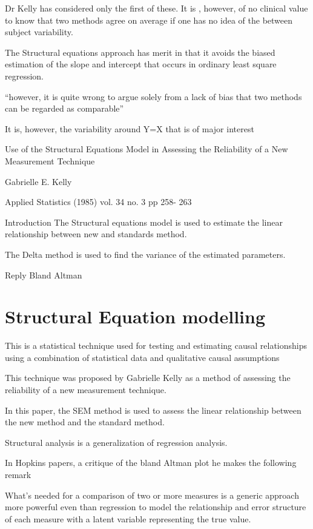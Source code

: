 \documentclass[12pt, a4paper]{report}
\theoremstyle{plain}
\theoremstyle{definition}
\theoremstyle{remark}
\begin{document}

Dr Kelly has considered only the first of these.
It is , however, of no clinical value to know that two methods agree on average if one has no idea of the between subject variability.

The Structural equations approach has merit in that it avoids the biased estimation of the slope and intercept that occurs in ordinary least square regression.

“however, it is quite wrong to argue solely from a lack of bias that two methods can be regarded as comparable”

It is, however, the variability around Y=X that is of major interest


Use of the Structural Equations Model in Assessing the Reliability of a New Measurement Technique

Gabrielle E. Kelly

Applied Statistics (1985) vol. 34 no. 3 pp 258- 263

Introduction
The Structural equations model is used to estimate the linear relationship between new and standards method.

The Delta method is used to find the variance of the estimated parameters.

Reply
Bland Altman 


\section{Structural Equation modelling}

This is a statistical technique used for testing and estimating causal relationships using a combination of statistical data and qualitative causal assumptions

This technique was proposed by Gabrielle Kelly as a method of assessing the reliability of a new measurement technique.

In this paper, the SEM method is used to assess the linear relationship between the new method and the standard method.

Structural analysis is a generalization of regression analysis.

In Hopkins papers, a critique of the bland Altman plot he makes the following remark

What's needed for a comparison of two or more measures is a generic approach more powerful even than regression to model the relationship and error structure of each measure with a latent variable representing the true value.  
\end{document}
